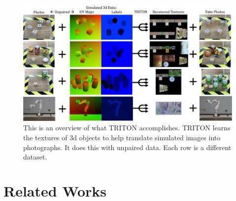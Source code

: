 \documentclass{article}
\begin{document}
\begin{figure}[thbp]
	\vspace{-10pt}
		\begin{center}
			\includegraphics[width=\textwidth]{../images/first_diagram.pdf}
		\end{center}
		\vspace{-5pt}
		\caption{
			This is an overview of what TRITON accomplishes.
			TRITON learns the textures of 3d objects to help translate simulated images into photographs. It does this with unpaired data. Each row is a different dataset.
			}
		\label{fig:first_diagram}
	\vspace{-5pt}
	\end{figure}
	
\vspace{-5pt}	
\section{Related Works}
\vspace{-3pt}
\end{document}
